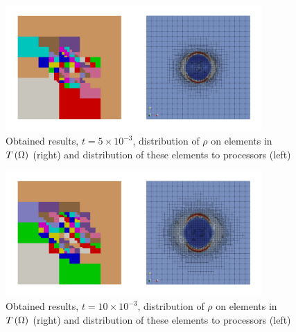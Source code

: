 \begin{figure}[H]
	\begin{center}
		\includegraphics[width=0.87\textwidth]{img/mhd-blast/old/mya2.jpg}
	\caption{Obtained results, $t = 5\times 10^{-3}$, distribution of $\rho$ on elements in $T\left(\Omega\right)$ (right) and distribution of these elements to processors (left)}
	\label{figure:blastOldMyAdapt2}
	\end{center}
\end{figure}
\vspace{-8mm}

\begin{figure}[H]
	\begin{center}
		\includegraphics[width=0.87\textwidth]{img/mhd-blast/old/mya3.jpg}
	\caption{Obtained results, $t = 10\times 10^{-3}$, distribution of $\rho$ on elements in $T\left(\Omega\right)$ (right) and distribution of these elements to processors (left)}
	\label{figure:blastOldMyAdapt3}
	\end{center}
\end{figure}
\vspace{-8mm}

